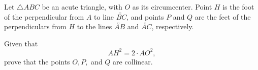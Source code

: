 Let $\triangle ABC$ be an acute triangle, with $O$ as its circumcenter. Point $H$ is the foot of the perpendicular from $A$ to line $\overleftrightarrow{BC}$, and points $P$ and $Q$ are the feet of the perpendiculars from $H$ to the lines $\overleftrightarrow{AB}$ and $\overleftrightarrow{AC}$, respectively.

Given that $$AH^2=2\cdot AO^2,$$ prove that the points $O,P,$ and $Q$ are collinear.